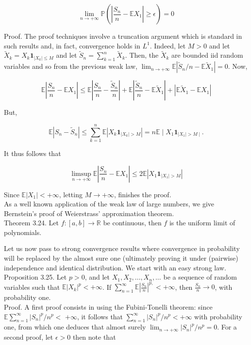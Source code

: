 \documentclass{amsbook}
\theoremstyle{plain}%
\theoremstyle{definition}
\theoremstyle{remark}
\begin{document}
  $$
  \lim _{n \rightarrow+\infty} \mathbb{P}\left(\left|\frac{S_{n}}{n}-\mathbb{E} X_{1}\right| \geq \epsilon\right)=0
  $$

  Proof. The proof techniques involve a truncation argument which is standard in such results and, in fact, convergence holds in $L^{1}$. Indeed, let $M>0$ and let $\widetilde{X}_{k}=X_{k} \mathbf{1}_{\left|X_{k}\right| \leq M}$ and let $\widetilde{S}_{n}=\sum_{k=1}^{n} \widetilde{X}_{k}$. Then, the $\widetilde{X}_{k}$ are bounded iid random variables and so from the previous weak law, $\lim _{n \rightarrow+\infty} \mathbb{E}\left|\tilde{S}_{n} / n-\mathbb{E} \tilde{X}_{1}\right|=0$. Now,

  $$
  \mathbb{E}\left|\frac{S_{n}}{n}-\mathbb{E} X_{1}\right| \leq \mathbb{E}\left|\frac{S_{n}}{n}-\frac{\widetilde{S}_{n}}{n}\right|+\mathbb{E}\left|\frac{\widetilde{S}_{n}}{n}-\mathbb{E} \widetilde{X}_{1}\right|+\left|\mathbb{E} \tilde{X}_{1}-\mathbb{E} X_{1}\right|
  $$

  But,

  $$
  \mathbb{E}\left|S_{n}-\widetilde{S}_{n}\right| \leq \sum_{k=1}^{n} \mathbb{E}\left|X_{k} \mathbf{1}_{\left|X_{k}\right|>M}\right|=n \mathbb{E} \mid X_{1} \mathbf{1}_{\left|X_{1}\right|>M \mid} .
  $$

  It thus follows that

  $$
  \limsup _{n \rightarrow+\infty} \mathbb{E}\left|\frac{S_{n}}{n}-\mathbb{E} X_{1}\right| \leq 2 \mathbb{E}\left|X_{1} \mathbf{1}_{\left|X_{1}\right|>M}\right|
  $$

  Since $\mathbb{E}\left|X_{1}\right|<+\infty$, letting $M \rightarrow+\infty$, finishes the proof.\\
  As a well known application of the weak law of large numbers, we give Bernstein's proof of Weierstrass' approximation theorem.\\
  Theorem 3.24. Let $f:[a, b] \longrightarrow \mathbb{R}$ be continuous, then $f$ is the uniform limit of polynomials.

  Let us now pass to strong convergence results where convergence in probability will be replaced by the almost sure one (ultimately proving it under (pairwise) independence and identical distribution. We start with an easy strong law.\\
    Proposition 3.25. Let $p>0$, and let $X_{1}, X_{2}, \ldots, X_{n}, \ldots$ be a sequence of random variables such that $\mathbb{E}\left|X_{k}\right|^{p}<+\infty$. If $\sum_{n=1}^{\infty} \mathbb{E}\left|\frac{S_{n}}{n}\right|^{p,}<+\infty$, then $\frac{S_{n}}{n} \rightarrow 0$, with probability one.\\
    Proof. A first proof consists in using the Fubini-Tonelli theorem: since $\mathbb{E} \sum_{n=1}^{\infty}\left|S_{n}\right|^{p} / n^{p}<$ $+\infty$, it follows that $\sum_{n=1}^{\infty}\left|S_{n}\right|^{p} / n^{p}<+\infty$ with probability one, from which one deduces that almost surely $\lim _{n \rightarrow+\infty}\left|S_{n}\right|^{p} / n^{p}=0$. For a second proof, let $\epsilon>0$ then note that
\end{document}
